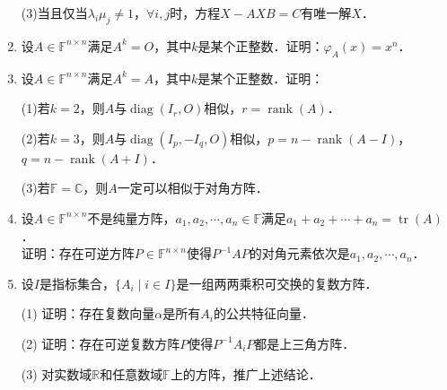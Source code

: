 \documentclass[a4paper,fontset=windows]{ctexbook}
\theoremstyle{definition}
\DeclareMathOperator{\diag}{diag}
\DeclareMathOperator{\rank}{rank}
\DeclareMathOperator{\tr}{tr}
\renewcommand{\le}{\leqslant}
\renewcommand{\ge}{\geqslant}
\begin{document}
\begin{enumerate}
(3)当且仅当$\lambda_i\mu_j\ne 1$，$\forall i,j$时，方程$X-AXB=C$有唯一解$X$．

\item 设$A\in\mathbb{F}^{n\times n}$满足$A^k=O$，其中$k$是某个正整数．证明：$\varphi_A(x)=x^n$．

\item 设$A\in\mathbb{F}^{n\times n}$满足$A^k=A$，其中$k$是某个正整数．证明：

(1)若$k=2$，则$A$与$\diag(I_r,O)$相似，$r=\rank(A)$．

(2)若$k=3$，则$A$与$\diag(I_p,-I_q,O)$相似，$p=n-\rank(A-I)$，$q=n-\rank(A+I)$．

(3)若$\mathbb{F=C}$，则$A$一定可以相似于对角方阵．

\item 设$A\in\mathbb{F}^{n\times n}$不是纯量方阵，$a_1,a_2,\cdots,a_n\in\mathbb{F}$满足$a_1+a_2+\cdots+a_n=\tr(A)$．\\
证明：存在可逆方阵$P\in\mathbb{F}^{n\times n}$使得$P^{-1}AP$的对角元素依次是$a_1,a_2,\cdots,a_n$．

\item 设$I$是指标集合，$\{A_i\mid i\in I\}$是一组两两乘积可交换的复数方阵．

(1) 证明：存在复数向量$\alpha$是所有$A_i$的公共特征向量．

(2) 证明：存在可逆复数方阵$P$使得$P^{-1}A_iP$都是上三角方阵．

(3) 对实数域$\mathbb{R}$和任意数域$\mathbb{F}$上的方阵，推广上述结论．

\end{enumerate}
\end{document}
